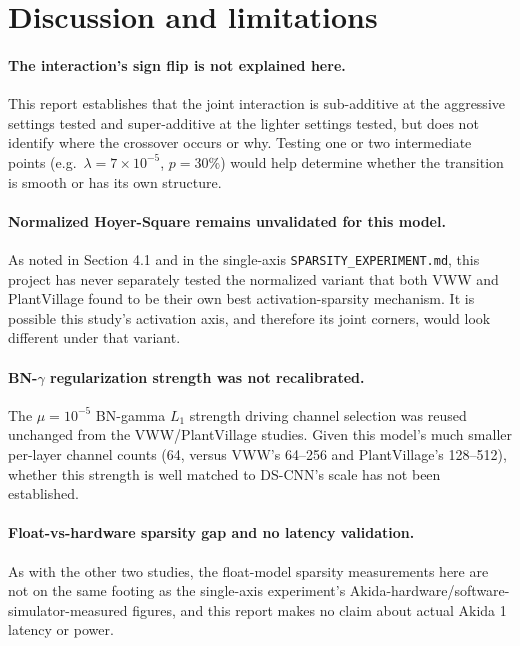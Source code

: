\documentclass[11pt]{article}
\newcommand{\code}[1]{\texttt{#1}}
\begin{document}
\section{Discussion and limitations}

\paragraph{The interaction's sign flip is not explained here.} This report establishes that the joint interaction is sub-additive at the aggressive settings tested and super-additive at the lighter settings tested, but does not identify where the crossover occurs or why. Testing one or two intermediate points (e.g.\ $\lambda=7\times10^{-5}$, $p=30\%$) would help determine whether the transition is smooth or has its own structure.

\paragraph{Normalized Hoyer-Square remains unvalidated for this model.} As noted in Section 4.1 and in the single-axis \code{SPARSITY\_EXPERIMENT.md}, this project has never separately tested the normalized variant that both VWW and PlantVillage found to be their own best activation-sparsity mechanism. It is possible this study's activation axis, and therefore its joint corners, would look different under that variant.

\paragraph{BN-$\gamma$ regularization strength was not recalibrated.} The $\mu=10^{-5}$ BN-gamma $L_1$ strength driving channel selection was reused unchanged from the VWW/PlantVillage studies. Given this model's much smaller per-layer channel counts (64, versus VWW's 64--256 and PlantVillage's 128--512), whether this strength is well matched to DS-CNN's scale has not been established.

\paragraph{Float-vs-hardware sparsity gap and no latency validation.} As with the other two studies, the float-model sparsity measurements here are not on the same footing as the single-axis experiment's Akida-hardware/software-simulator-measured figures, and this report makes no claim about actual Akida 1 latency or power.
\end{document}
